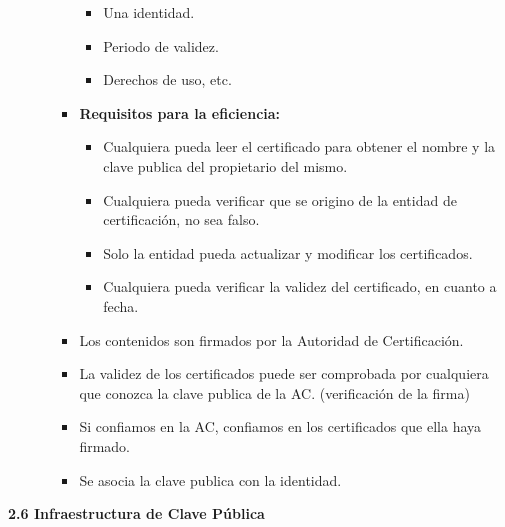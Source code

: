 \documentclass[12pt, twoside, openright]{report} %
\begin{document}
\begin{itemize}
\begin{itemize}
\begin{itemize}
        \begin{itemize}
        \item Una identidad.
          
        \item Periodo de validez.
          
        \item Derechos de uso, etc.
          
        \end{itemize}
      \item \textbf{Requisitos para la eficiencia:}
        

        \begin{itemize}
        \item Cualquiera pueda leer el certificado para obtener el nombre y
          la clave publica del propietario del mismo.
          
        \item Cualquiera pueda verificar que se origino de la entidad de
          certificación, no sea falso.
          
        \item Solo la entidad pueda actualizar y modificar los certificados.
          
        \item Cualquiera pueda verificar la validez del certificado, en
          cuanto a fecha.
          
        \end{itemize}
      \item Los contenidos son firmados por la Autoridad de Certificación.
        
      \item La validez de los certificados puede ser comprobada por
        cualquiera que conozca la clave publica de la AC. (verificación
        de la firma)
        
      \item Si confiamos en la AC, confiamos en los certificados que ella
        haya firmado.
        
      \item Se asocia la clave publica con la identidad.
        
      \end{itemize}
    \end{itemize}
  \end{itemize}

  
  \textbf{2.6 Infraestructura de Clave Pública}
  
\end{document}
